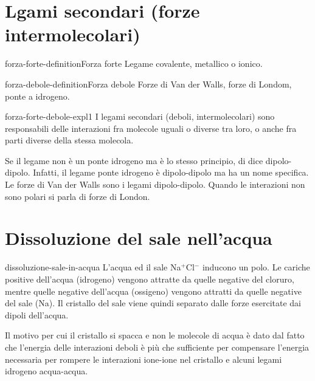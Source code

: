 \documentclass[preview]{standalone}
\begin{document}
\genpage

\section{Lgami secondari (forze intermolecolari)}

\begin{snippetdefinition}{forza-forte-definition}{Forza forte}
    Legame covalente, metallico o ionico.
\end{snippetdefinition}

\begin{snippetdefinition}{forza-debole-definition}{Forza debole}
    Forze di Van der Walls, forze di Londom, ponte a idrogeno.
\end{snippetdefinition}

\begin{snippet}{forza-forte-debole-expl1}
    I legami secondari (deboli, intermolecolari) sono responsabili delle interazioni fra molecole uguali o diverse tra loro,
    o anche fra parti diverse della stessa molecola.

    Se il legame non è un ponte idrogeno ma è lo stesso principio, di dice dipolo-dipolo.
    Infatti, il legame ponte idrogeno è dipolo-dipolo ma ha un nome specifica.
    Le forze di Van der Walls sono i legami dipolo-dipolo.
    Quando le interazioni non sono polari si parla di forze di London.
\end{snippet}

\section{Dissoluzione del sale nell'acqua}

\begin{snippet}{dissoluzione-sale-in-acqua}
L'acqua ed il sale Na\(^{+}\)Cl\(^{-}\) inducono un polo.
Le cariche positive dell'acqua (idrogeno) vengono attratte da quelle negative
del cloruro, mentre quelle negative dell'acqua (ossigeno)
vengono attratti da quelle negative del sale (Na).
Il cristallo del sale viene quindi separato dalle forze
esercitate dai dipoli dell'acqua.

Il motivo per cui il cristallo si spacca e non le molecole di acqua
è dato dal fatto che l'energia delle interazioni deboli è più che sufficiente
per compensare l'energia necessaria per rompere le interazioni ione-ione
nel cristallo e alcuni legami idrogeno acqua-acqua.
\end{snippet}
\end{document}
